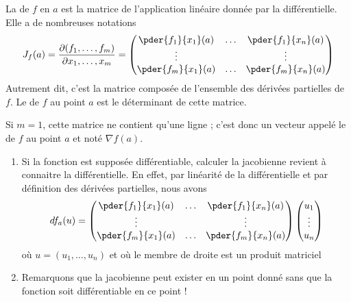 \begin{definition}
	La  de \( f\) en \( a\) est la matrice de l'application linéaire donnée par la différentielle. Elle a de nombreuses notations
	\begin{equation}
		J_f(a) = \frac{ \partial (f_1,\ldots, f_m) }{ \partial x_1,\ldots, x_m }=
		\begin{pmatrix}
			\pder {f_1} {x_1}(a) & \ldots & \pder {f_1} {x_n}(a) \\
			\vdots               &        & \vdots               \\
			\pder {f_m} {x_1}(a) & \ldots & \pder {f_m} {x_n}(a)
		\end{pmatrix}
	\end{equation}
	Autrement dit, c'est la matrice composée de l'ensemble des dérivées partielles de \( f\). Le  de \( f\) au point \( a\) est le déterminant de cette matrice.

	Si \( m = 1\), cette matrice ne contient qu'une ligne ; c'est donc un vecteur appelé le  de \( f\) au point \( a\) et noté \( \nabla f(a)\).
\end{definition}

\begin{remark}
	\begin{enumerate}
		\item Si la fonction est supposée différentiable, calculer la
		      jacobienne revient à connaitre la différentielle. En effet, par
		      linéarité de la différentielle et par définition des dérivées
		      partielles, nous avons
		      \begin{equation*}
			      d f_a (u) =%
			      \begin{pmatrix}
				      \pder {f_1} {x_1}(a) & \ldots & \pder {f_1} {x_n}(a) \\
				      \vdots               &        & \vdots               \\
				      \pder {f_m} {x_1}(a) & \ldots & \pder {f_m} {x_n}(a)
			      \end{pmatrix}
			      \begin{pmatrix}u_1\\\vdots\\u_n\end{pmatrix}
		      \end{equation*}
		      où \( u = (u_1, \ldots, u_n)\) et où le membre de droite est un
		      produit matriciel

		\item Remarquons que la jacobienne peut exister en un point donné
		      sans que la fonction soit différentiable en ce point !
	\end{enumerate}
\end{remark}


